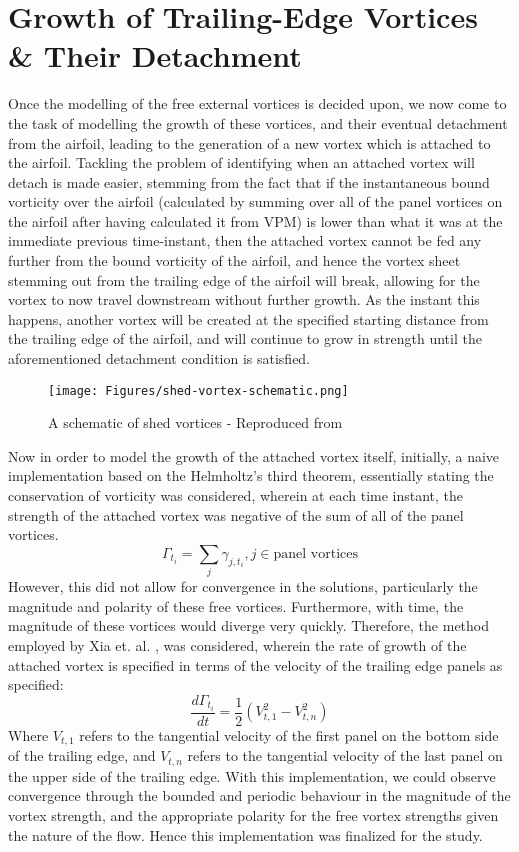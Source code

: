 \section{Growth of Trailing-Edge Vortices \& Their Detachment}
Once the modelling of the free external vortices is decided upon, we now come to the task of modelling the growth of these vortices, and their eventual detachment from the airfoil, leading to the generation of a new vortex which is attached to the airfoil.
Tackling the problem of identifying when an attached vortex will detach is made easier, stemming from the fact that if the instantaneous bound vorticity over the airfoil (calculated by summing over all of the panel vortices on the airfoil after having calculated it from VPM) is lower than what it was at the immediate previous time-instant, then the attached vortex cannot be fed any further from the bound vorticity of the airfoil, and hence the vortex sheet stemming out from the trailing edge of the airfoil will break, allowing for the vortex to now travel downstream without further growth.
As the instant this happens, another vortex will be created at the specified starting distance from the trailing edge of the airfoil, and will continue to grow in strength until the aforementioned detachment condition is satisfied.

\begin{figure}[H]
	\centering
	\texttt{[image: Figures/shed-vortex-schematic.png]}
	\caption{A schematic of shed vortices - Reproduced from \parencite{nasa-shed-vortex} }
	\label{fig:shed-vortex-schematic}
\end{figure}

Now in order to model the growth of the attached vortex itself, initially, a naive implementation based on the Helmholtz's third theorem, essentially stating the conservation of vorticity was considered, wherein at each time instant, the strength of the attached vortex was negative of the sum of all of the panel vortices.
\begin{equation}
    \Gamma_{t_i} = \sum_j \gamma_{j, t_i}, j \in \text{panel vortices}
\end{equation}
However, this did not allow for convergence in the solutions, particularly the magnitude and polarity of these free vortices. Furthermore, with time, the magnitude of these vortices would diverge very quickly.
Therefore, the method employed by Xia et. al. \parencite{Xia2017}, was considered, wherein the rate of growth of the attached vortex is specified in terms of the velocity of the trailing edge panels as specified:
\begin{equation}
    \frac{d \Gamma_{t_i}}{d t} = \frac{1}{2} (V_{t, 1}^2 - V_{t,n}^2)
\end{equation}
Where $V_{t, 1}$ refers to the tangential velocity of the first panel on the bottom side of the trailing edge, and $V_{t, n}$ refers to the tangential velocity of the last panel on the upper side of the trailing edge.
With this implementation, we could observe convergence through the bounded and periodic behaviour in the magnitude of the vortex strength, and the appropriate polarity for the free vortex strengths given the nature of the flow. Hence this implementation was finalized for the study.


